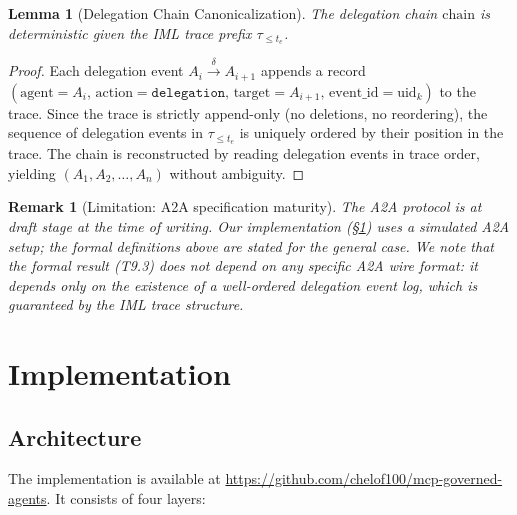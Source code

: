 \documentclass[11pt]{article}
\newtheorem{lemma}[theorem]{Lemma}
\newtheorem{remark}{Remark}[section]
\newcommand{\delegateto}{\xrightarrow{\delta}}
\newcommand{\chain}{\mathrm{chain}}
\begin{document}
\begin{lemma}[Delegation Chain Canonicalization]
\label{lem:l931}
The delegation chain $\chain$ is deterministic given the IML trace
prefix $\tau_{\le t_e}$.
\end{lemma}

\begin{proof}
Each delegation event $A_i \delegateto A_{i+1}$ appends a record
$(\text{agent}=A_i,\,\text{action}=\texttt{delegation},\,
\text{target}=A_{i+1},\,\text{event\_id}=\text{uid}_k)$
to the trace. Since the trace is strictly append-only (no deletions,
no reordering), the sequence of delegation events in $\tau_{\le t_e}$
is uniquely ordered by their position in the trace.
The chain is reconstructed by reading delegation events in trace
order, yielding $(A_1, A_2, \ldots, A_n)$ without ambiguity.
\end{proof}

\begin{remark}[Limitation: A2A specification maturity]
The A2A protocol \citep{google2025a2a} is at draft stage at the time
of writing. Our implementation (\S\ref{sec:impl}) uses a simulated
A2A setup; the formal definitions above are stated for the general
case. We note that the formal result (T9.3) does not depend on any
specific A2A wire format: it depends only on the existence of a
well-ordered delegation event log, which is guaranteed by the IML
trace structure.
\end{remark}

\section{Implementation}
\label{sec:impl}

\subsection{Architecture}

The implementation is available at
\url{https://github.com/chelof100/mcp-governed-agents}.
It consists of four layers:
\end{document}
